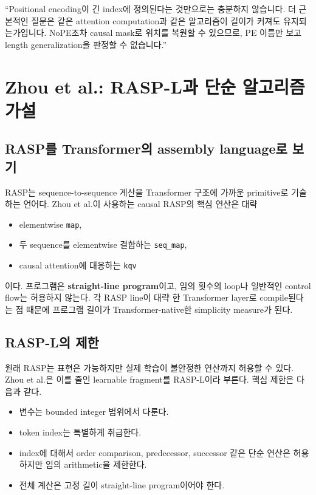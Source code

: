 \documentclass[11pt,a4paper,oneside,openany]{memoir}
\theoremstyle{definition}
\begin{document}
\begin{presentbox}
``Positional encoding이 긴 index에 정의된다는 것만으로는 충분하지 않습니다. 더 근본적인 질문은 같은 attention computation과 같은 알고리즘이 길이가 커져도 유지되는가입니다. NoPE조차 causal mask로 위치를 복원할 수 있으므로, PE 이름만 보고 length generalization을 판정할 수 없습니다.''
\end{presentbox}

\chapter{Zhou et al.: RASP-L과 단순 알고리즘 가설}

\section{RASP를 Transformer의 assembly language로 보기}

RASP는 sequence-to-sequence 계산을 Transformer 구조에 가까운 primitive로 기술하는 언어다.
Zhou et al.이 사용하는 causal RASP의 핵심 연산은 대략
\begin{itemize}
\item elementwise \texttt{map},
\item 두 sequence를 elementwise 결합하는 \texttt{seq\_map},
\item causal attention에 대응하는 \texttt{kqv}
\end{itemize}
이다.
프로그램은 \textbf{straight-line program}이고, 임의 횟수의 loop나 일반적인 control flow는 허용하지 않는다.
각 RASP line이 대략 한 Transformer layer로 compile된다는 점 때문에 프로그램 길이가 Transformer-native한 simplicity measure가 된다.

\section{RASP-L의 제한}

원래 RASP는 표현은 가능하지만 실제 학습이 불안정한 연산까지 허용할 수 있다.
Zhou et al.은 이를 줄인 learnable fragment를 RASP-L이라 부른다.
핵심 제한은 다음과 같다.

\begin{itemize}
\item 변수는 bounded integer 범위에서 다룬다.
\item token index는 특별하게 취급한다.
\item index에 대해서 order comparison, predecessor, successor 같은 단순 연산은 허용하지만 임의 arithmetic을 제한한다.
\item 전체 계산은 고정 길이 straight-line program이어야 한다.
\end{itemize}
\end{document}
